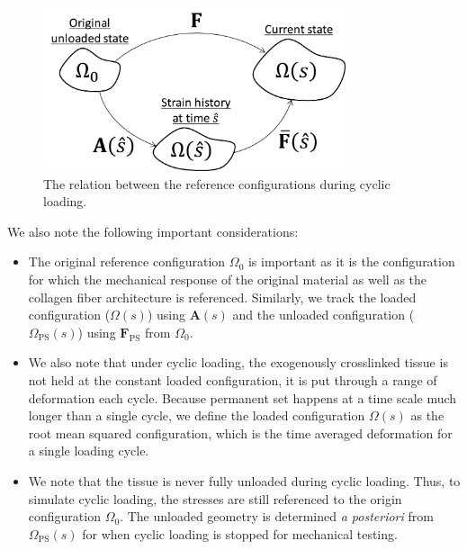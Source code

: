 \begin{figure}[hbt]
\centering
\includegraphics[width=3.5in]{Images/chapter4/figure7}
\caption{The relation between the reference configurations during cyclic loading.}
\label{fig:stateevolution}
\end{figure}

    We also note the following important considerations:
\begin{itemize}
\item The original reference configuration $\Omega_0$ is important as it is the configuration for which the mechanical response of the original material as well as the collagen fiber architecture is referenced. Similarly, we track the loaded configuration ($\Omega(s)$) using $\mathbf{A}(s)$ and the unloaded configuration ($\Omega_\mathrm{PS}(s)$) using $\mathbf{F}_\mathrm{PS}$ from $\Omega_0$. 

\item We also note that under cyclic loading, the exogenously crosslinked tissue is not held at the constant loaded configuration, it is put through a range of deformation each cycle. Because permanent set happens at a time scale much longer than a single cycle, we define the loaded configuration $\Omega(s)$ as the root mean squared configuration, which is the time averaged deformation for a single loading cycle. 

\item We note that the tissue is never fully unloaded during cyclic loading. Thus, to simulate cyclic loading, the stresses are still referenced to the origin configuration $\Omega_0$. The unloaded geometry is determined \textit{a posteriori} from $\Omega_\mathrm{PS}(s)$ for when cyclic loading is stopped for mechanical testing. 
\end{itemize}



